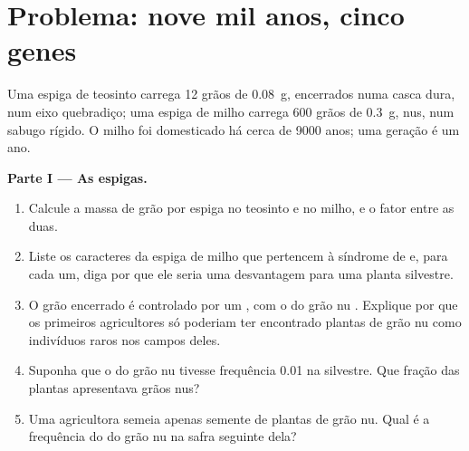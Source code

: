 \section{Problema: nove mil anos, cinco genes}

\begin{problem}
\label{pb:g12:domesticated-plants:1}
Uma espiga de teosinto carrega 12 grãos de \qty{0.08}{g}, encerrados
numa casca dura, num eixo quebradiço; uma espiga de milho carrega 600
grãos de \qty{0.3}{g}, nus, num sabugo rígido. O milho foi domesticado
há cerca de 9000 anos; uma geração é um ano.

\medskip
\noindent\textbf{Parte I --- As espigas.}
\begin{enumerate}
  \item Calcule a massa de grão por espiga no teosinto e no milho, e o
        fator entre as duas.
  \item Liste os caracteres da espiga de milho que pertencem à síndrome
        de  e, para cada um, diga por que ele seria uma
        desvantagem para uma planta silvestre.
  \item O grão encerrado é controlado por um , com o  do grão
        nu . Explique por que os primeiros agricultores só
        poderiam ter encontrado plantas de grão nu como indivíduos
        raros nos campos deles.
  \item Suponha que o  do grão nu tivesse frequência 0.01 na
         silvestre. Que fração das plantas apresentava grãos nus?
  \item Uma agricultora semeia apenas semente de plantas de grão nu.
        Qual é a frequência do  do grão nu na safra seguinte dela?
\end{enumerate}


\end{problem}
